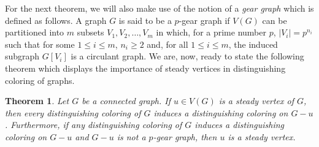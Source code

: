 \documentclass[12pt,a4paper, longbibliography]{article}
\newtheorem{theorem}{{\color{THM} Theorem}}[section]
\theoremstyle{definition}
\numberwithin{equation}{section}
\begin{document}
	
For the next theorem, we will also make use of the notion of a \textit{gear graph} which is defined as follows. A graph $G$ is said to be a $p$-gear graph if $V(G)$ can be partitioned into $m$ subsets $V_1, V_2, \ldots, V_m$ in which, for a prime number $p$, $|V_i| = p^{n_i}$ such that for some $1 \leq i \leq m$, $n_i \geq 2$ and, for all $1 \leq i \leq m$, the induced subgraph $G[V_i]$ is a circulant graph. 	
We are, now, ready to state the following theorem which displays the importance of steady vertices in distinguishing coloring of graphs.

\begin{theorem}\label{steady_iff}
Let $G$ be a connected graph. If $u \in V(G)$ is a steady vertex of $G$, then every distinguishing coloring of $G$ induces a distinguishing coloring on $G-u$. Furthermore, if any distinguishing coloring of $G$ induces a distinguishing coloring on $G-u$ and $G-u$ is not a $p$-gear graph, then $u$ is a steady vertex.
\end{theorem}
\end{document}
